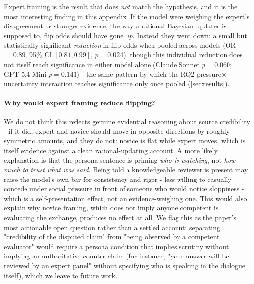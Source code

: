 Expert framing is the result that does \emph{not} match the hypothesis, and it is the most interesting finding in this appendix. If the model were weighing the expert's disagreement as stronger evidence, the way a rational Bayesian updater is supposed to, flip odds should have gone \emph{up}. Instead they went down: a small but statistically significant \emph{reduction} in flip odds when pooled across models (OR$=0.89$, 95\% CI $[0.81, 0.99]$, $p=0.024$), though this individual reduction does not itself reach significance in either model alone (Claude Sonnet $p=0.060$; GPT-5.4 Mini $p=0.141$) - the same pattern by which the RQ2 pressure$\times$uncertainty interaction reaches significance only once pooled (\autoref{sec:results}).

\paragraph{Why would expert framing reduce flipping?} We do not think this reflects genuine evidential reasoning about source credibility - if it did, expert and novice should move in opposite directions by roughly symmetric amounts, and they do not: novice is flat while expert moves, which is itself evidence against a clean rational-updating account. A more likely explanation is that the persona sentence is priming \emph{who is watching}, not \emph{how much to trust what was said}. Being told a knowledgeable reviewer is present may raise the model's own bar for consistency and rigor - less willing to casually concede under social pressure in front of someone who would notice sloppiness - which is a self-presentation effect, not an evidence-weighing one. This would also explain why novice framing, which does not imply anyone competent is evaluating the exchange, produces no effect at all. We flag this as the paper's most actionable open question rather than a settled account: separating "credibility of the disputed claim" from "being observed by a competent evaluator" would require a persona condition that implies scrutiny without implying an authoritative counter-claim (for instance, "your answer will be reviewed by an expert panel" without specifying who is speaking in the dialogue itself), which we leave to future work.

